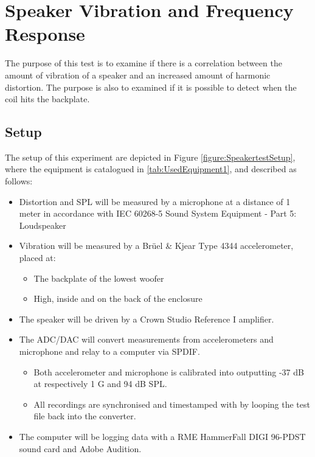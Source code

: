 \section{Speaker Vibration and Frequency Response}\label{app:journal_1}

The purpose of this test is to examine if there is a correlation between the amount of vibration of a speaker and an increased amount of harmonic distortion. The purpose is also to examined if it is possible to detect when the coil hits the backplate. 

\subsection{Setup}

The setup of this experiment are depicted in Figure \ref{figure:SpeakertestSetup}, where the equipment is catalogued in \autoref{tab:UsedEquipment1}, and described as follows:

\begin{itemize}
\item Distortion and \gls{SPL} will be measured by a microphone at a distance of 1 meter in accordance with IEC 60268-5 Sound System Equipment - Part 5: Loudspeaker
\item Vibration will be measured by a Brüel \& Kjear Type 4344 accelerometer, placed at:
\begin{itemize}
\item The backplate of the lowest woofer
\item High, inside and on the back of the enclosure 
\end{itemize}
\item The speaker will be driven by a Crown Studio Reference I amplifier.
\item The ADC/DAC will convert measurements from accelerometers and microphone and relay to a computer via SPDIF.
\begin{itemize}
\item Both accelerometer and microphone is calibrated into outputting -37 dB at respectively 1 G and 94 dB \gls{SPL}.
\item All recordings are synchronised and timestamped with by looping the test file back into the converter.
\end{itemize}
\item The computer will be logging data with a RME HammerFall DIGI 96-PDST sound card and Adobe Audition.
\end{itemize}

